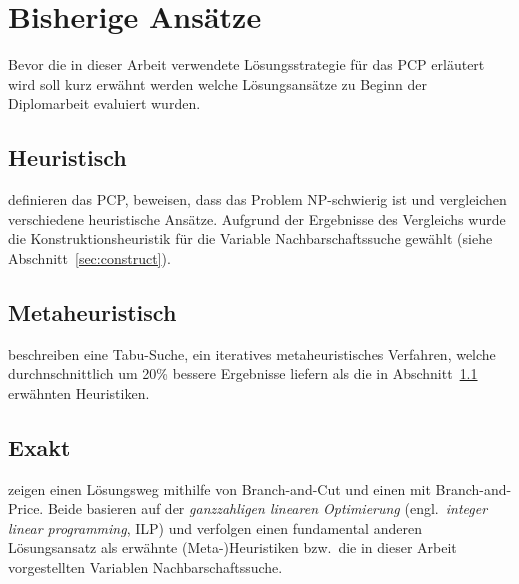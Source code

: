 \section{Bisherige Ansätze}
Bevor die in dieser Arbeit verwendete Lösungsstrategie für das PCP erläutert wird soll kurz erwähnt werden welche Lösungsansätze zu Beginn der Diplomarbeit evaluiert wurden.

\subsection{Heuristisch}
\label{sec:li2000}
\citet*{Li2000} definieren das PCP, beweisen, dass das Problem NP-schwierig ist und vergleichen verschiedene heuristische Ansätze. Aufgrund der Ergebnisse des Vergleichs wurde die Konstruktionsheuristik für die Variable Nachbarschaftssuche gewählt (siehe Abschnitt~\ref{sec:construct}).

\subsection{Metaheuristisch}
\citet*{Noronha2006} beschreiben eine Tabu-Suche, ein iteratives metaheuristisches Verfahren, welche durchnschnittlich um 20\% bessere Ergebnisse liefern als die in Abschnitt~\ref{sec:li2000} erwähnten Heuristiken.

\subsection{Exakt}
\citet*{Frota2010} zeigen einen Lösungsweg mithilfe von Branch-and-Cut und \citet*{Hoshino2011} einen mit Branch-and-Price. Beide basieren auf der \textit{ganzzahligen linearen Optimierung} (engl.\ \textit{integer linear programming}, ILP) und verfolgen einen fundamental anderen Lösungsansatz als erwähnte (Meta-)Heuristiken bzw.\ die in dieser Arbeit vorgestellten Variablen Nachbarschaftssuche.
